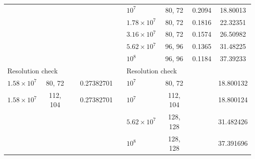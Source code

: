\begin{table}[t]
\begin{tabular}{lcccc|lccc}
 & & & &  & $10^{7}$ & 80, 72 & 0.2094 & 18.80013 \\
 & & & &  & $1.78\times10^{7}$ & 80, 72 & 0.1816 & 22.32351 \\
 & & & &  & $3.16\times10^{7}$ & 80, 72 & 0.1574 & 26.50982 \\
 & & & &  & $5.62\times10^{7}$ & 96, 96 & 0.1365 & 31.48225 \\
 & & & &  & $10^{8}$ & 96, 96 & 0.1184 & 37.39233 \\
\hline
\multicolumn{5}{l|}{Resolution check} & \multicolumn{4}{l}{Resolution check}\\
$1.58\times10^{7}$ & 80, 72 & & 0.27382701 &  & $10^{7}$ & 80, 72 & & 18.800132 \\
$1.58\times10^{7}$ & 112, 104 & & 0.27382701 &  & $10^{7}$ & 112, 104 & & 18.800124 \\
 & & & &  & $5.62\times10^{7}$ & 128, 128 & & 31.482426 \\
 & & & &  & $10^{8}$ & 128, 128 & & 37.391696 \\
\hline\end{tabular}\end{table}
